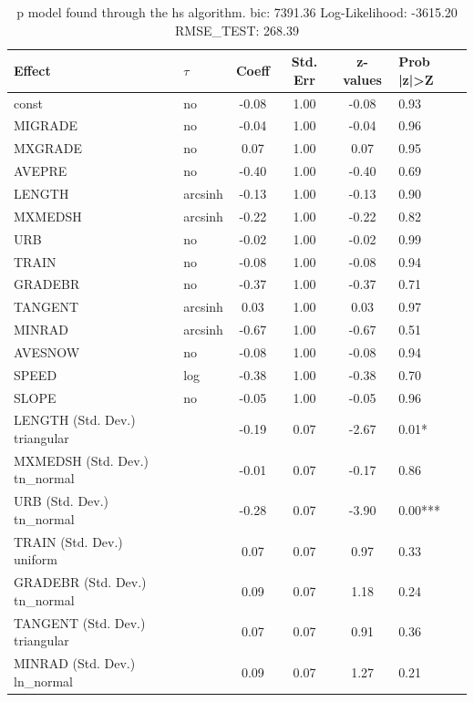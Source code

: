 \begin{table}
	\caption{p model found through the hs algorithm. bic: 7391.36 Log-Likelihood: -3615.20 RMSE_TEST: 268.39}
	\begin{center}
		\begin{tabular}{|l|l|c|c|c|l|}
			\hline
			Effect & $\tau$ & Coeff & Std. Err & z-values & Prob |z|>Z \\
			\hline
			const & no & -0.08 & 1.00 & -0.08 & 0.93 \\
			\hline
			MIGRADE & no & -0.04 & 1.00 & -0.04 & 0.96 \\
			\hline
			MXGRADE & no & 0.07 & 1.00 & 0.07 & 0.95 \\
			\hline
			AVEPRE & no & -0.40 & 1.00 & -0.40 & 0.69 \\
			\hline
			LENGTH & arcsinh & -0.13 & 1.00 & -0.13 & 0.90 \\
			\hline
			MXMEDSH & arcsinh & -0.22 & 1.00 & -0.22 & 0.82 \\
			\hline
			URB & no & -0.02 & 1.00 & -0.02 & 0.99 \\
			\hline
			TRAIN & no & -0.08 & 1.00 & -0.08 & 0.94 \\
			\hline
			GRADEBR & no & -0.37 & 1.00 & -0.37 & 0.71 \\
			\hline
			TANGENT & arcsinh & 0.03 & 1.00 & 0.03 & 0.97 \\
			\hline
			MINRAD & arcsinh & -0.67 & 1.00 & -0.67 & 0.51 \\
			\hline
			AVESNOW & no & -0.08 & 1.00 & -0.08 & 0.94 \\
			\hline
			SPEED & log & -0.38 & 1.00 & -0.38 & 0.70 \\
			\hline
			SLOPE & no & -0.05 & 1.00 & -0.05 & 0.96 \\
			\hline
			LENGTH (Std. Dev.) triangular &  & -0.19 & 0.07 & -2.67 & 0.01* \\
			\hline
			MXMEDSH (Std. Dev.) tn_normal &  & -0.01 & 0.07 & -0.17 & 0.86 \\
			\hline
			URB (Std. Dev.) tn_normal &  & -0.28 & 0.07 & -3.90 & 0.00*** \\
			\hline
			TRAIN (Std. Dev.) uniform &  & 0.07 & 0.07 & 0.97 & 0.33 \\
			\hline
			GRADEBR (Std. Dev.) tn_normal &  & 0.09 & 0.07 & 1.18 & 0.24 \\
			\hline
			TANGENT (Std. Dev.) triangular &  & 0.07 & 0.07 & 0.91 & 0.36 \\
			\hline
			MINRAD (Std. Dev.) ln_normal &  & 0.09 & 0.07 & 1.27 & 0.21 \\

\end{tabular}
\end{center}
\end{table}
